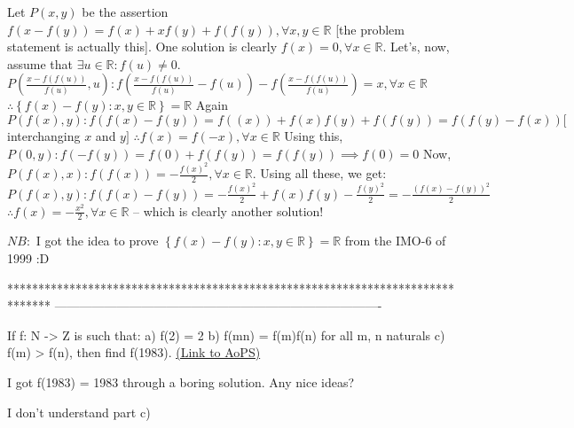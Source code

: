 \begin{solution}
	Let $P(x, y)$ be the assertion $f(x-f(y))=f(x)+xf(y)+f(f(y)), \forall x, y \in \mathbb{R}$ [the problem statement is actually this].
One solution is clearly $f(x)=0, \forall x \in \mathbb{R}$.
Let's, now, assume that $\exists u \in \mathbb{R} : f(u) \neq 0$.
$P(\frac{x-f(f(u))}{f(u)}, u) : f(\frac{x-f(f(u))}{f(u)}-f(u)) - f(\frac{x-f(f(u))}{f(u)}) = x, \forall x \in \mathbb{R}$
$\therefore \left\{f(x)-f(y):x,y \in \mathbb{R}\right\} = \mathbb{R}$
Again $P(f(x), y) : f(f(x)-f(y)) = f((x)) + f(x)f(y) + f(f(y)) = f(f(y)-f(x)) [$ interchanging $x$ and $y]$
$\therefore f(x)=f(-x), \forall x \in \mathbb{R}$
Using this, $P(0, y) : f(-f(y))=f(0)+f(f(y))=f(f(y)) \implies f(0)=0$
Now, $P(f(x), x) : f(f(x))=-\frac{f(x)^2}{2}, \forall x \in \mathbb{R}$.
Using all these, we get:
$P(f(x), y): f(f(x)-f(y))=-\frac{f(x)^2}{2}+f(x)f(y)-\frac{f(y)^2}{2} = -\frac{(f(x)-f(y))^2}{2}$
$\therefore f(x) = -\frac{x^2}{2}, \forall x \in \mathbb{R}$ -- which is clearly another solution!


$NB:$ I got the idea to prove $\left\{f(x)-f(y):x,y \in \mathbb{R}\right\} = \mathbb{R}$ from the IMO-6 of 1999 :D
\end{solution}
*******************************************************************************
-------------------------------------------------------------------------------

\begin{problem}
	If f: N -> Z is such that:
a) f(2) = 2
b) f(mn) = f(m)f(n) for all m, n naturals
c) f(m) > f(n), then find f(1983).
	\flushright \href{https://artofproblemsolving.com/community/c6h592327}{(Link to AoPS)}
\end{problem}



\begin{solution}
	I got f(1983) = 1983 through a boring solution. Any nice ideas?
\end{solution}



\begin{solution}
	I don't understand part c)
\end{solution}



